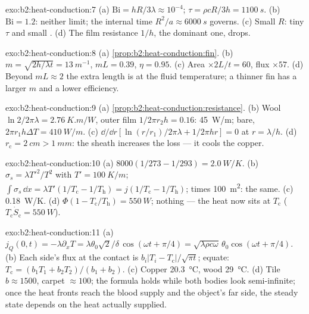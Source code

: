\begin{solution}{exo:b2:heat-conduction:7}
(a) $\mathrm{Bi} = hR/3\lambda \approx 10^{-4}$; $\tau = \rho cR/3h = \qty{1100}{s}$.
(b) $\mathrm{Bi} = 1.2$: neither limit; the internal time $R^2/a \approx
\qty{6000}{s}$ governs. (c) Small $R$: tiny $\tau$ and small .
(d) The film resistance $1/h$, the dominant one, drops.
\end{solution}

\begin{solution}{exo:b2:heat-conduction:8}
(a) \cref{prop:b2:heat-conduction:fin}. (b) $m = \sqrt{2h/\lambda t} =
\qty{13}{m^{-1}}$, $mL = 0.39$, $\eta = 0.95$. (c) Area $\times 2L/t = 60$, flux
$\times 57$. (d) Beyond $mL \approx 2$ the extra length is at the fluid
temperature; a thinner fin has a larger $m$ and a lower efficiency.
\end{solution}

\begin{solution}{exo:b2:heat-conduction:9}
(a) \cref{prop:b2:heat-conduction:resistance}. (b) Wool $\ln 2/2\pi\lambda =
\qty{2.76}{K.m/W}$, outer film $1/2\pi r_2h = 0.16$: \qty{45}{W/m}; bare,
$2\pi r_1h\Delta T = \qty{410}{W/m}$. (c) $\dd/\dd r[\ln(r/r_1)/2\pi\lambda + 1/2\pi hr]
= 0$ at $r = \lambda/h$. (d) $r_{\text{c}} = \qty{2}{cm} > \qty{1}{mm}$: the sheath
increases the loss --- it cools the copper.
\end{solution}

\begin{solution}{exo:b2:heat-conduction:10}
(a) $8000(1/273 - 1/293) = \qty{2.0}{W/K}$. (b) $\sigma_s = \lambda T'^2/T^2$ with
$T' = \qty{100}{K/m}$; $\int\sigma_s\,\dd x = \lambda T'(1/T_{\text{c}} - 1/T_{\text{h}})
= j(1/T_{\text{c}} - 1/T_{\text{h}})$; times \qty{100}{m^2}: the same. (c)
\qty{0.18}{W/K}. (d) $\Phi(1 - T_{\text{c}}/T_{\text{h}}) = \qty{550}{W}$; nothing
--- the heat now sits at $T_{\text{c}}$ ($T_{\text{c}}\dot S_{\text{c}} = \qty{550}{W}$).
\end{solution}

\begin{solution}{exo:b2:heat-conduction:11}
(a) $j_Q(0,t) = -\lambda\partial_xT = \lambda\theta_0\sqrt2/\delta\,\cos(\omega t +
\pi/4) = \sqrt{\lambda\rho c\omega}\,\theta_0\cos(\omega t + \pi/4)$. (b) Each
side's flux at the contact is $b_i|T_i - T_{\text{c}}|/\sqrt{\pi t}$; equate:
$T_{\text{c}} = (b_1T_1 + b_2T_2)/(b_1 + b_2)$. (c) Copper \qty{20.3}{\celsius},
wood \qty{29}{\celsius}. (d) Tile $b \approx 1500$, carpet $\approx 100$; the
formula holds while both bodies look semi-infinite; once the heat
fronts reach the blood supply and the object's far side, the steady
state depends on the heat actually supplied.
\end{solution}

